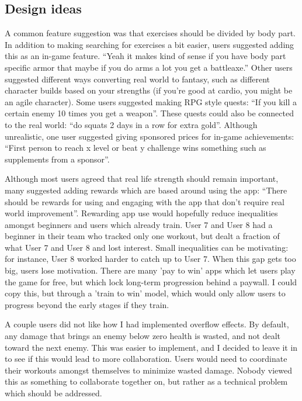 \documentclass{l4proj}
\begin{document}
\subsection{Design ideas}
A common feature suggestion was that exercises should be divided by body part. In addition to making searching for exercises a bit easier, users suggested adding this as an in-game feature. ``Yeah it makes kind of sense if you have body part specific armor that maybe if you do arms a lot you get a battleaxe.'' Other users suggested different ways converting real world to fantasy, such as different character builds based on your strengths (if you're good at cardio, you might be an agile character). Some users suggested making RPG style quests: ``If you kill a certain enemy 10 times you get a weapon''. These quests could also be connected to the real world: ``do squats 2 days in a row for extra gold''. Although unrealistic, one user suggested giving sponsored prices for in-game achievements: ``First person to reach x level or beat y challenge wins something such as supplements from a sponsor''.

Although most users agreed that real life strength should remain important, many suggested adding rewards which are based around using the app: ``There should be rewards for using and engaging with the app that don't require real world improvement''. Rewarding app use would hopefully reduce inequalities amongst beginners and users which already train.  User 7 and User 8 had a beginner in their team who tracked only one workout, but dealt a fraction of what User 7 and User 8 and lost interest. Small inequalities can be motivating: for instance, User 8 worked harder to catch up to User 7. When this gap gets too big, users lose motivation. There are many 'pay to win' apps which let users play the game for free, but which lock long-term progression behind a paywall. I could copy this, but through a 'train to win' model, which would only allow users to progress beyond the early stages if they train. 

A couple users did not like how I had implemented overflow effects. By default, any damage that brings an enemy below zero health is wasted, and not dealt toward the next enemy. This was easier to implement, and I decided to leave it in to see if this would lead to more collaboration. Users would need to coordinate their workouts amongst themselves to minimize wasted damage. Nobody viewed this as something to collaborate together on, but rather as a technical problem which should be addressed.
\end{document}
